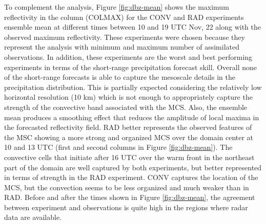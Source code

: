 \documentclass[final,5p,times,twocolumn,authoryear]{elsarticle} %
\begin{document}
To complement the analysis, Figure \ref{fig:dbz-mean} shows the maximum reflectivity in the column (COLMAX) for the CONV and RAD experiments ensemble mean at different times between 10 and 19 UTC Nov, 22 along with the observed maximum reflectivity. These experiments were chosen because they represent the analysis with minimum and maximum number of assimilated observations. In addition, these experiments are the worst and best performing experiments in terms of the short-range precipitation forecast skill. Overall none of the short-range forecasts is able to capture the mesoscale details in the precipitation distribution. This is partially expected considering the relatively low horizontal resolution (10 km) which is not enough to appropriately capture the strength of the convective band associated with the MCS. Also, the ensemble mean produces a smoothing effect that reduces the amplitude of local maxima in the forecasted reflectivity field. RAD better represents the observed features of the MSC showing a more strong and organized MCS over the domain center at 10 and 13 UTC (first and second columns in Figure \ref{fig:dbz-mean}). The convective cells that initiate after 16 UTC over the warm front in the northeast part of the domain are well captured by both experiments, but better represented in terms of strength in the RAD experiment. CONV captures the location of the MCS, but the convection seems to be less organized and much weaker than in RAD. Before and after the times shown in Figure \ref{fig:dbz-mean}, the agreement between experiment and observations is quite high in the regions where radar data are available.
\end{document}
